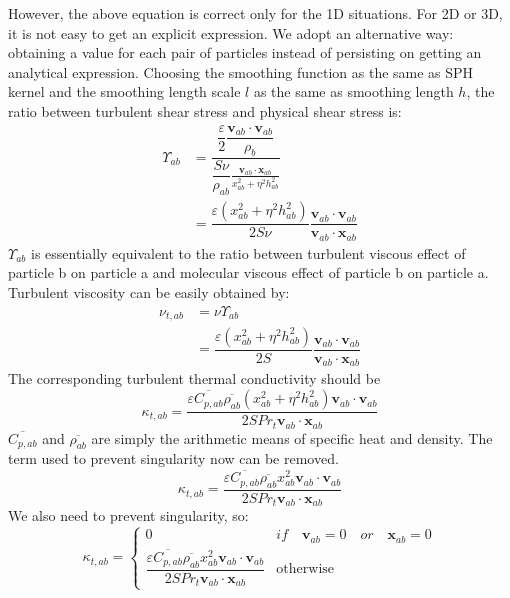 \documentclass[gmd, manuscript]{copernicus}
\begin{document}
However, the above equation is correct only for the 1D situations. For 2D or 3D, it is not easy to get an explicit expression. 
We adopt an alternative way: obtaining a value for each pair of particles instead of persisting on getting an analytical expression. Choosing the smoothing function as the same as SPH kernel and the smoothing length scale $l$ as the same as smoothing length $h$, the ratio between turbulent shear stress and physical shear stress is: 
\begin{equation}
\begin{split}
\Upsilon_{ab} &= \dfrac{\dfrac{\varepsilon}{2} \dfrac{\textbf{v}_{ab} \cdot \textbf{v}_{ab}}{\rho_b}}{\dfrac{S \nu}{\rho_{ab}} \frac{\textbf{v}_{ab} \cdot \textbf{x}_{ab}}{x_{ab}^2 + \eta^2 h_{ab}^2}} \\
 & = \dfrac{\varepsilon \left(x_{ab}^2 + \eta^2 h_{ab}^2\right)}{2 S \nu} \dfrac{\textbf{v}_{ab} \cdot \textbf{v}_{ab}}{\textbf{v}_{ab} \cdot \textbf{x}_{ab}}
\end{split}
\end{equation}
$\Upsilon_{ab}$ is essentially equivalent to the ratio between turbulent viscous effect of particle b on particle a and molecular viscous effect of particle b on particle a. Turbulent viscosity can be easily obtained by:
\begin{equation}
\begin{split}
\nu_{t,ab} &= \nu \Upsilon_{ab} \\
&= \dfrac{\varepsilon \left(x_{ab}^2 + \eta^2 h_{ab}^2\right)}{2 S} \dfrac{\textbf{v}_{ab} \cdot \textbf{v}_{ab}}{\textbf{v}_{ab} \cdot \textbf{x}_{ab}}
\end{split}
\end{equation}
The corresponding turbulent thermal conductivity should be
\begin{equation}
\kappa_{t,ab}=\dfrac{\varepsilon \overline{C_{p,ab}} \overline{\rho_{ab}} \left(x_{ab}^2 + \eta^2 h_{ab}^2\right) \textbf{v}_{ab} \cdot \textbf{v}_{ab}}{2 S Pr_t\textbf{v}_{ab} \cdot \textbf{x}_{ab}}
\end{equation}
$\overline{C_{p,ab}}$ and $\overline{\rho_{ab}}$ are simply the arithmetic means of specific heat and density. The term used to prevent singularity now can be removed. 
\begin{equation}
\kappa_{t,ab}=\dfrac{\varepsilon \overline{C_{p,ab}} \overline{\rho_{ab}} x_{ab}^2 \textbf{v}_{ab} \cdot \textbf{v}_{ab}}{2 S Pr_t\textbf{v}_{ab} \cdot \textbf{x}_{ab} }
\end{equation}
We also need to prevent singularity, so: 
\begin{equation}
\kappa_{t,ab}= 
\begin{cases} 
      0 & if  \quad \textbf{v}_{ab}=0 \quad or \quad \textbf{x}_{ab}=0 \\
      \dfrac{\varepsilon \overline{C_{p,ab}} \overline{\rho_{ab}} x_{ab}^2 \textbf{v}_{ab} \cdot \textbf{v}_{ab}}{2 S Pr_t\textbf{v}_{ab} \cdot \textbf{x}_{ab} } & \text{otherwise}
\end{cases}
\label{eq:SPH-LANS-heat-conductivity}
\end{equation}
\end{document}
